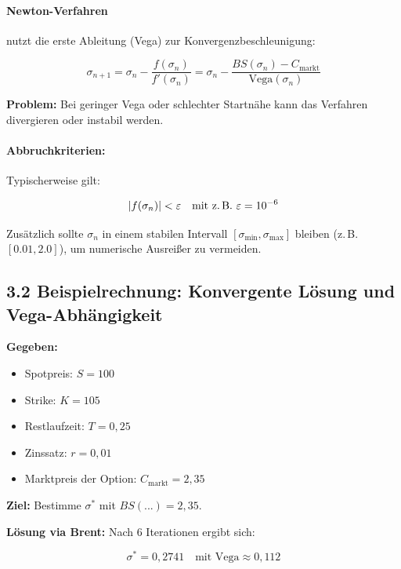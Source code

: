 \documentclass[a4paper,12pt]{article}
\begin{document}
\paragraph{Newton-Verfahren} nutzt die erste Ableitung (Vega) zur Konvergenzbeschleunigung:

\[
\sigma_{n+1} = \sigma_n - \frac{f(\sigma_n)}{f'(\sigma_n)} = \sigma_n - \frac{BS(\sigma_n) - C_{\text{markt}}}{\text{Vega}(\sigma_n)}
\]

\textbf{Problem:} Bei geringer Vega oder schlechter Startnähe kann das Verfahren divergieren oder instabil werden.

\paragraph{Abbruchkriterien:}
Typischerweise gilt:

\[
|f(\sigma_n)| < \varepsilon \quad \text{mit z.\,B. } \varepsilon = 10^{-6}
\]

Zusätzlich sollte $\sigma_n$ in einem stabilen Intervall $[\sigma_{\min}, \sigma_{\max}]$ bleiben (z.\,B. $[0.01, 2.0]$), um numerische Ausreißer zu vermeiden.

\subsection*{3.2 Beispielrechnung: Konvergente Lösung und Vega-Abhängigkeit}

\textbf{Gegeben:}
\begin{itemize}
  \item Spotpreis: $S = 100$
  \item Strike: $K = 105$
  \item Restlaufzeit: $T = 0{,}25$
  \item Zinssatz: $r = 0{,}01$
  \item Marktpreis der Option: $C_{\text{markt}} = 2{,}35$
\end{itemize}

\textbf{Ziel:} Bestimme $\sigma^*$ mit $BS(...) = 2{,}35$.

\textbf{Lösung via Brent:}  
Nach 6 Iterationen ergibt sich:

\[
\sigma^* = 0{,}2741 \quad \text{mit } \text{Vega} \approx 0{,}112
\]
\end{document}
